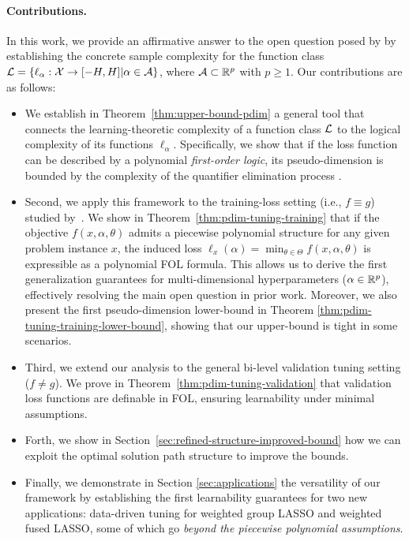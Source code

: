 \documentclass{article}
\theoremstyle{plain}
\theoremstyle{definition}
\theoremstyle{remark}
\begin{document}
\paragraph{Contributions.} In this work, we provide an affirmative answer to the open question posed by \citet{balcan2025sample} by establishing the concrete sample complexity for the function class $\mathcal{L} = \{\ell_\alpha: \mathcal{X} \rightarrow [-H, H] | \alpha \in \mathcal{A}\}$, where $\mathcal{A} \subset \mathbb{R}^p$ with $p \ge 1$. Our contributions are as follows:
\begin{itemize}[leftmargin=*]
    \item We establish in Theorem~\ref{thm:upper-bound-pdim} a general tool that connects the learning-theoretic complexity of a function class $\mathcal{L}$ to the logical complexity of its functions $\ell_\alpha$. Specifically, we show that if the loss function can be described by a polynomial \textit{first-order logic}, its pseudo-dimension is bounded by the complexity of the quantifier elimination process \citep{basu2006algorithms}.
    \item Second, we apply this framework to the training-loss setting (i.e., $f \equiv g$) studied by~\citet{balcan2025sample}. We show in Theorem~\ref{thm:pdim-tuning-training} that if the objective $f(x, \alpha, \theta)$ admits a piecewise polynomial structure for any given problem instance $x$, the induced loss $\ell_x(\alpha) = \min_{\theta \in \Theta}f(x, \alpha, \theta)$ is expressible as a polynomial FOL formula. This allows us to derive the first generalization guarantees for multi-dimensional hyperparameters ($\alpha \in \mathbb{R}^p$), effectively resolving the main open question in prior work.  Moreover, we also present the first pseudo-dimension lower-bound in Theorem \ref{thm:pdim-tuning-training-lower-bound}, showing that our upper-bound is tight in some scenarios.
    \item Third, we extend our analysis to the general bi-level validation tuning setting ($f \neq g$). We prove in Theorem~\ref{thm:pdim-tuning-validation} that validation loss functions are definable in FOL, ensuring learnability under minimal assumptions. 
    \item Forth, we show in Section~\ref{sec:refined-structure-improved-bound} how we can exploit the optimal solution path structure to improve the bounds. 
    \item Finally, we
    demonstrate in Section \ref{sec:applications} the versatility of our framework by establishing the first learnability guarantees for two new applications: data-driven tuning for weighted group LASSO and weighted fused LASSO, some of which go \emph{beyond the piecewise polynomial assumptions}.
\end{itemize}
\end{document}
